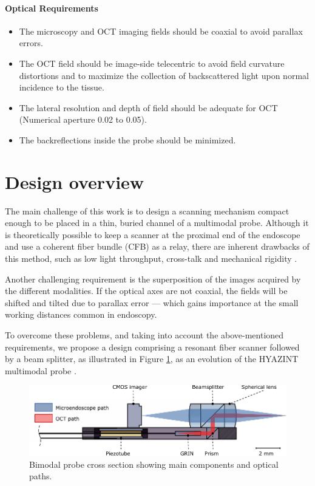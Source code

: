 \paragraph{Optical Requirements}

\begin{itemize}
\item The microscopy and OCT imaging fields should be coaxial to avoid parallax errors. 
\item The OCT field should be image-side telecentric to avoid field curvature distortions and to maximize the collection of backscattered light upon normal incidence to the tissue.
\item The lateral resolution and depth of field should be adequate for OCT (Numerical aperture 0.02 to 0.05).
\item The backreflections inside the probe should be minimized.
\end{itemize}

  

\section{Design overview}

The main challenge of this work is to design a scanning mechanism compact enough to be placed in a thin, buried channel of a multimodal probe. 
Although it is theoretically possible to keep a scanner at the proximal end of the endoscope and use a coherent fiber bundle (CFB) as a relay, there are inherent drawbacks of this method, such as low light throughput, cross-talk and mechanical rigidity \cite{Ford2009}. 

Another challenging requirement is the superposition of the images acquired by the different modalities. If the optical axes are not coaxial, the fields will be shifted and tilted due to parallax error --- which gains importance at the small working distances common in endoscopy.

To overcome these problems, and taking into account the above-mentioned requirements, we propose a design comprising a resonant fiber scanner followed by a beam splitter, as illustrated in Figure \ref{fig:bimodalSketch}, as an evolution of the HYAZINT multimodal probe \cite{Kretschmer}.

\begin{figure}[h!]\centering
      \includegraphics{figures/10_Introduction/bimodalSketch/out.pdf}
      \caption{Bimodal probe cross section showing main components and optical paths.}
      \label{fig:bimodalSketch}
\end{figure}

